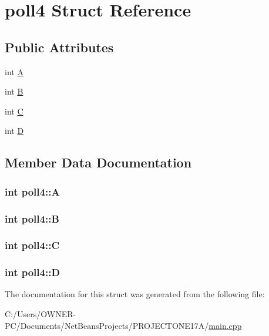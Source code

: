 \hypertarget{structpoll4}{\section{poll4 Struct Reference}
\label{structpoll4}
}
\subsection*{Public Attributes}
\begin{DoxyCompactItemize}
\item 
int \hyperlink{structpoll4_aa233e2819c62bea9bec33415b0d6314c}{A}
\item 
int \hyperlink{structpoll4_acb1586ddcee8e0833c1e301693c49a8e}{B}
\item 
int \hyperlink{structpoll4_a1d48fdfb277a003529b193756ea4f58e}{C}
\item 
int \hyperlink{structpoll4_a64c995e4772041fbc3d6b8a96cfe4c39}{D}
\end{DoxyCompactItemize}


\subsection{Member Data Documentation}
\hypertarget{structpoll4_aa233e2819c62bea9bec33415b0d6314c}{
\subsubsection[{A}]{\setlength{\rightskip}{0pt plus 5cm}int poll4\+::\+A}}\label{structpoll4_aa233e2819c62bea9bec33415b0d6314c}
\hypertarget{structpoll4_acb1586ddcee8e0833c1e301693c49a8e}{
\subsubsection[{B}]{\setlength{\rightskip}{0pt plus 5cm}int poll4\+::\+B}}\label{structpoll4_acb1586ddcee8e0833c1e301693c49a8e}
\hypertarget{structpoll4_a1d48fdfb277a003529b193756ea4f58e}{
\subsubsection[{C}]{\setlength{\rightskip}{0pt plus 5cm}int poll4\+::\+C}}\label{structpoll4_a1d48fdfb277a003529b193756ea4f58e}
\hypertarget{structpoll4_a64c995e4772041fbc3d6b8a96cfe4c39}{
\subsubsection[{D}]{\setlength{\rightskip}{0pt plus 5cm}int poll4\+::\+D}}\label{structpoll4_a64c995e4772041fbc3d6b8a96cfe4c39}


The documentation for this struct was generated from the following file\+:\begin{DoxyCompactItemize}
\item 
C\+:/\+Users/\+O\+W\+N\+E\+R-\/\+P\+C/\+Documents/\+Net\+Beans\+Projects/\+P\+R\+O\+J\+E\+C\+T\+O\+N\+E17\+A/\hyperlink{main_8cpp}{main.\+cpp}\end{DoxyCompactItemize}
